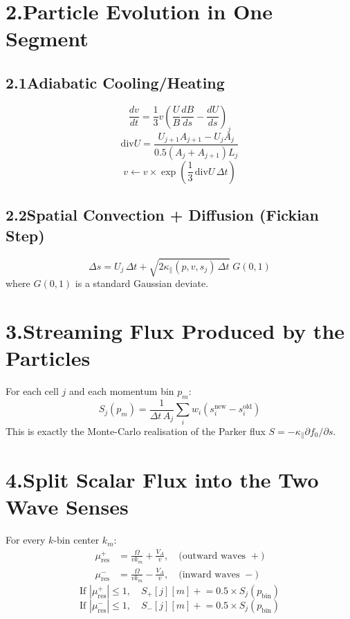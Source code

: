 \section*{2.\quad Particle Evolution in One Segment}

\subsection*{2.1\quad Adiabatic Cooling/Heating}

\[
\frac{dv}{dt} = \frac{1}{3} v \left( \frac{U}{B} \frac{dB}{ds} - \frac{dU}{ds} \right)_j
\]
\[
\text{div}U = \frac{U_{j+1} A_{j+1} - U_j A_j}{0.5 (A_j + A_{j+1}) L_j}
\]
\[
v \leftarrow v \times \exp\left( \frac{1}{3} \, \text{div}U \, \Delta t \right)
\]

\subsection*{2.2\quad Spatial Convection + Diffusion (Fickian Step)}

\[
\Delta s = U_j\,\Delta t + \sqrt{2\kappa_\parallel(p, v, s_j)\, \Delta t}\; G(0,1)
\]
where $G(0,1)$ is a standard Gaussian deviate.

\section*{3.\quad Streaming Flux Produced by the Particles}

For each cell $j$ and each momentum bin $p_m$:
\[
S_j(p_m) = \frac{1}{\Delta t \, A_j} \sum_i w_i (s_i^{\text{new}} - s_i^{\text{old}})
\]
This is exactly the Monte-Carlo realisation of the Parker flux $S = -\kappa_\parallel \partial f_0 / \partial s$.

\section*{4.\quad Split Scalar Flux into the Two Wave Senses}

For every $k$-bin center $k_m$:
\[
\begin{aligned}
\mu_{\text{res}}^{+} &= \frac{\Omega}{v k_m} + \frac{V_A}{v}, \quad \text{(outward waves } +\text{)} \\
\mu_{\text{res}}^{-} &= \frac{\Omega}{v k_m} - \frac{V_A}{v}, \quad \text{(inward waves } -\text{)}
\end{aligned}
\]
\[
\text{If } |\mu_{\text{res}}^{+}| \leq 1, \quad S_{+}[j][m] \mathrel{+}= 0.5 \times S_j(p_{\text{bin}})
\]
\[
\text{If } |\mu_{\text{res}}^{-}| \leq 1, \quad S_{-}[j][m] \mathrel{+}= 0.5 \times S_j(p_{\text{bin}})
\]

